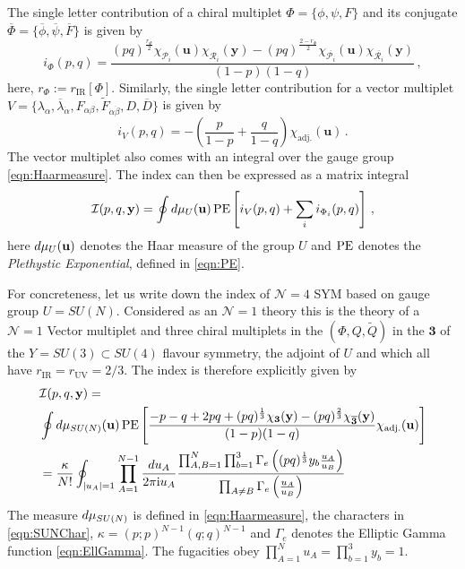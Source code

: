 \documentclass[main.tex]{subfiles}
\begin{document}
The single letter contribution of a chiral multiplet $\Phi=\{\phi,\psi,F\}$ and its conjugate $\overline{\Phi}=\{\overline{\phi},\overline{\psi},\overline{F}\}$ is given by
\begin{equation}
i_{\Phi}(p,q)=\frac{(pq)^{\frac{r_{\Phi}}{2}}\chi_{\mathcal{P}_i}(\mathbf{u})\chi_{\mathcal{R}_i}(\mathbf{y})-(pq)^{\frac{2-r_{\Phi}}{2}}\chi_{\overline{\mathcal{P}_i}}(\mathbf{u})\chi_{\overline{\mathcal{R}_i}}(\mathbf{y})}{(1-p)(1-q)}\,,
\end{equation}
here, $r_{\Phi}:=r_{\text{IR}}[\Phi]$.
Similarly, the single letter contribution for a vector multiplet $V=\{\lambda_{\alpha},\overline{\lambda}_{\dot\alpha},F_{\alpha\beta},\widetilde{F}_{\dot\alpha\dot\beta},D,\overline{D}\}$ is given by
\begin{equation}
i_{V}(p,q)=-\left(\frac{p}{1-p}+\frac{q}{1-q}\right)\chi_{\text{adj.}}(\mathbf{u})\,.
\end{equation} 
The vector multiplet also comes with an integral over the gauge group \eqref{eqn:Haarmeasure}.
The index can then be expressed as a matrix integral
\begin{equation}\label{eqn:indexpeexp}
\mathcal{I}(p,q,\mathbf{y})=\oint d \mu_U(\mathbf{u})\operatorname{\mathrm{PE}}\left[i_V(p,q)+\sum_{i}i_{\Phi_i}(p,q)\right]\,,
\end{equation}
here $d \mu_U(\mathbf{u})$ denotes the Haar measure of the group $U$ and $\operatorname{\mathrm{PE}}$ denotes the \textit{Plethystic Exponential}, defined in \eqref{eqn:PE}.

For concreteness, let us write down the index of $\mathcal{N}=4$ SYM based on gauge group $U=SU(N)$.  Considered as an $\mathcal{N}=1$ theory this is the theory of a $\mathcal{N}=1$ Vector multiplet and three chiral multiplets in the $(\Phi,Q,\widetilde{Q})$ in the $\mathbf{3}$ of the $Y=SU(3)\subset SU(4)$ flavour symmetry, the adjoint of $U$ and which all have $r_{\text{IR}}=r_{\text{UV}}=2/3$.  The index is therefore explicitly given by
\begin{equation}
\begin{aligned}
&\mathcal{I}(p,q,\mathbf{y})=\\
&\oint d \mu_{SU(N)}(\mathbf{u})\operatorname{\mathrm{PE}}\left[\frac{-p-q+2pq+(pq)^{\frac{1}{3}}\chi_{\mathbf{3}}(\mathbf{y})-(pq)^{\frac{2}{3}}\chi_{\overline{\mathbf{3}}}(\mathbf{y})}{(1-p)(1-q)}\chi_{\text{adj.}}(\mathbf{u})\right]\\
&=\frac{\kappa}{N!}\oint_{|u_A|=1}\prod_{A=1}^{N-1}\frac{d u_A}{2\pi\mathrm{i} u_A}\frac{\prod_{A,B=1}^N\prod_{b=1}^3\Gamma_e\left((pq)^{\frac{1}{3}}y_b\frac{u_A}{u_B}\right)}{\prod_{A\neq B}\Gamma_e\left(\frac{u_A}{u_B}\right)}
\end{aligned}
\end{equation}
The measure $d \mu_{SU(N)}$ is defined in \eqref{eqn:Haarmeasure}, the characters in \eqref{eqn:SUNChar}, $\kappa=(p;p)^{N-1}(q;q)^{N-1}$ and $\Gamma_e$ denotes the Elliptic Gamma function \eqref{eqn:EllGamma}.
The fugacities obey $\prod_{A=1}^Nu_A=\prod_{b=1}^3y_b=1$.
\end{document}
